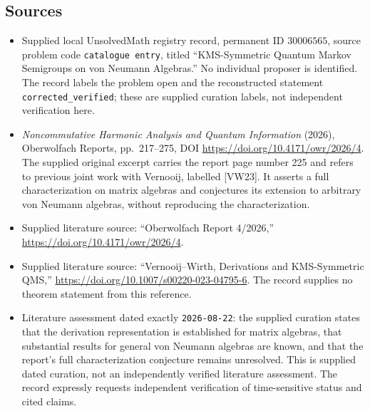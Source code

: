 \documentclass[11pt]{article}
\begin{document}
\subsection{Sources}
\begin{itemize}
\item Supplied local UnsolvedMath registry record, permanent ID \(30006565\), source problem code \texttt{catalogue entry}, titled ``KMS-Symmetric Quantum Markov Semigroups on von Neumann Algebras.'' No individual proposer is identified. The record labels the problem open and the reconstructed statement \texttt{corrected\_verified}; these are supplied curation labels, not independent verification here.
\item \emph{Noncommutative Harmonic Analysis and Quantum Information} (2026), Oberwolfach Reports, pp.\ 217--275, DOI \url{https://doi.org/10.4171/owr/2026/4}. The supplied original excerpt carries the report page number 225 and refers to previous joint work with Vernooij, labelled [VW23]. It asserts a full characterization on matrix algebras and conjectures its extension to arbitrary von Neumann algebras, without reproducing the characterization.
\item Supplied literature source: ``Oberwolfach Report 4/2026,'' \url{https://doi.org/10.4171/owr/2026/4}.
\item Supplied literature source: ``Vernooij--Wirth, Derivations and KMS-Symmetric QMS,'' \url{https://doi.org/10.1007/s00220-023-04795-6}. The record supplies no theorem statement from this reference.
\item Literature assessment dated exactly \texttt{2026-08-22}: the supplied curation states that the derivation representation is established for matrix algebras, that substantial results for general von Neumann algebras are known, and that the report's full characterization conjecture remains unresolved. This is supplied dated curation, not an independently verified literature assessment. The record expressly requests independent verification of time-sensitive status and cited claims.
\end{itemize}
\end{document}
